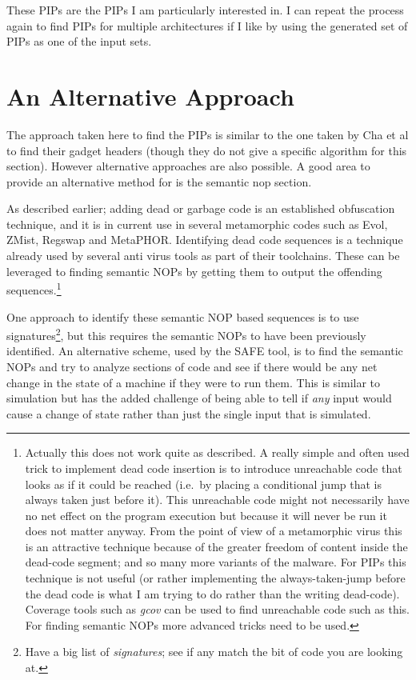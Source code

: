 \documentclass[10pt]{book}
\begin{document}
These PIPs are the PIPs I am particularly interested in. I can repeat
the process again to find PIPs for multiple architectures if I like by
using the generated set of PIPs as one of the input sets.

\section{An Alternative Approach}

The approach taken here to find the PIPs is similar to the one taken by
Cha et al\autocite{Cha:2010uh} to find their gadget headers (though they
do not give a specific algorithm for this section). However alternative
approaches are also possible. A good area to provide an alternative
method for is the semantic nop section.

As described earlier; adding dead or garbage code is an established
obfuscation technique, and it is in current use in several metamorphic
codes such as Evol, ZMist, Regswap and
MetaPHOR\autocite{Borello:2008vx}. Identifying dead code sequences is a
technique already used by several anti virus tools as part of their
toolchains. These can be leveraged to finding semantic NOPs by getting
them to output the offending sequences.\footnote{Actually this does not
  work quite as described. A really simple and often used trick to
  implement dead code insertion is to introduce unreachable code that
  looks as if it could be reached (i.e.~by placing a conditional jump
  that is always taken just before it). This unreachable code might not
  necessarily have no net effect on the program execution but because it
  will never be run it does not matter anyway. From the point of view of
  a metamorphic virus this is an attractive technique because of the
  greater freedom of content inside the dead-code segment; and so many
  more variants of the malware. For PIPs this technique is not useful
  (or rather implementing the always-taken-jump before the dead code is
  what I am trying to do rather than the writing dead-code). Coverage
  tools such as \emph{gcov} can be used to find unreachable code such as
  this.\autocite{Administrator:ul} For finding semantic NOPs more
  advanced tricks need to be used.}

One approach to identify these semantic NOP based sequences is to use
signatures\footnote{Have a big list of \emph{signatures}; see if any
  match the bit of code you are looking at.}, but this requires the
semantic NOPs to have been previously identified. An alternative scheme,
used by the SAFE tool\autocite{Christodorescu:2006vz}, is to find the
semantic NOPs and try to analyze sections of code and see if there would
be any net change in the state of a machine if they were to run them.
This is similar to simulation but has the added challenge of being able
to tell if \emph{any} input would cause a change of state rather than
just the single input that is simulated.
\end{document}
